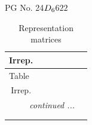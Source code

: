 \documentclass[fleqn,8pt,landscape]{jsarticle}
\begin{document}
\setcounter{MaxMatrixCols}{32}

\renewcommand{\tablename}{Table~}
\renewcommand{\figurename}{Figure~}
\begin{center}
\LARGE
PG No. 24\quad$D_{\rm 6}$\quad$622$\quad[ hexagonal ]
\end{center}
\renewcommand{\arraystretch}{1.2}
\begin{longtable}{ccccccc}
\caption{Representation matrices}
 \\
 \hline \hline
Irrep. &  &  &  &  &  &  \\ \hline \endfirsthead

\multicolumn{6}{l}{\tablename\ \thetable{}} \\
 \hline \hline
Irrep. &  &  &  &  &  &  \\ \hline \endhead

 \hline \hline
\multicolumn{6}{r}{\footnotesize\it continued ...} \\ \endfoot

 \hline \hline
\multicolumn{6}{r}{} \\ \endlastfoot


\end{longtable}
\end{document}
